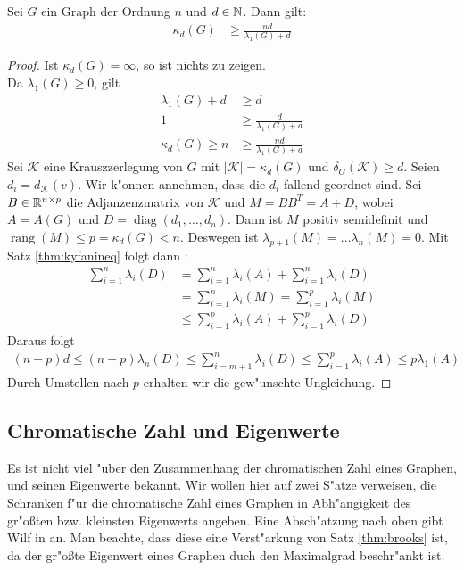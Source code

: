 \begin{theorem}
  Sei $G$ ein Graph der Ordnung $n$ und $d\in {\mathbb{N}}$. Dann gilt:
  \begin{align*}
    \kappa_{d}(G) &\geq \frac{nd}{\lambda_{1}(G) +d} 
  \end{align*}
  \label{thm:kappaineq1}
\end{theorem}

\begin{proof}
  Ist $\kappa_{d}(G) = \infty$, so ist nichts zu zeigen. \\
   Da $\lambda_{1}(G) \geq 0$, gilt 
  \begin{align*}
    \lambda_{1}(G) + d &\geq d \\
    1 &\geq \frac{d}{\lambda_{1}(G) + d }\\
    \kappa_{d}(G) \geq n &\geq \frac{nd}{\lambda_{1}(G)+d}
  \end{align*}
  Sei $\mathcal{K}$ eine Krauszzerlegung von $G$ mit $|\mathcal{K}| = \kappa_{d}(G)$ und $\delta_{G}(\mathcal{K}) \geq d$. Seien $d_{i} = d_{\mathcal{K}}(v)$. Wir k"onnen annehmen, dass die $d_{i}$ fallend geordnet sind. Sei $B\in {\mathbb{R}}^{n\times p}$ die Adjanzenzmatrix von $\mathcal{K}$ und $M = BB^{T} = A+D$, wobei $A= A(G)$ und $D = \operatorname{diag}(d_{1},\dots,d_n)$.
  Dann ist $M$ positiv semidefinit und $\operatorname{rang} (M) \leq p = \kappa_{d}(G) < n $. Deswegen ist $\lambda_{p+1}(M) = \dots \lambda_{n}(M) = 0$. 
  Mit Satz \ref{thm:kyfanineq} folgt dann : 
  \begin{align*}
    \sum\limits_{i=1}^{n} \lambda_{i}(D) &=\sum\limits_{i=1}^{n} \lambda_{i}(A) +\sum\limits_{i=1}^{n}  \lambda_{i}(D) \\
    &=\sum\limits_{i=1}^{n} \lambda_{i}(M) =\sum\limits_{i=1}^{p} \lambda_{i}(M) \\
    &\leq \sum\limits_{i=1}^{p} \lambda_{i}(A) +\sum\limits_{i=1}^{p} \lambda_{i}(D)
  \end{align*}
  Daraus folgt 
  \begin{align*}
    (n-p) d \leq (n-p) \lambda_n(D) \leq \sum\limits_{i=m+1}^{n} \lambda_{i}(D) \leq\sum\limits_{i=1}^{p} \lambda_{i}(A) \leq p\lambda_{1}(A)
  \end{align*}
  Durch Umstellen nach $p$ erhalten wir die gew"unschte Ungleichung.
\end{proof}

\subsection{Chromatische Zahl und Eigenwerte}
Es ist nicht viel "uber den Zusammenhang der chromatischen Zahl eines Graphen, und seinen Eigenwerte bekannt. Wir wollen hier auf zwei S"atze verweisen, die Schranken f"ur die chromatische Zahl eines Graphen in Abh"angigkeit des gr"o{\ss}ten bzw. kleinsten Eigenwerts angeben. Eine Absch"atzung nach oben  gibt Wilf in \cite{Wilf67} an. Man beachte, dass diese eine Verst"arkung von Satz \ref{thm:brooks} ist, da der gr"o{\ss}te Eigenwert eines Graphen duch den Maximalgrad
beschr"ankt ist.


